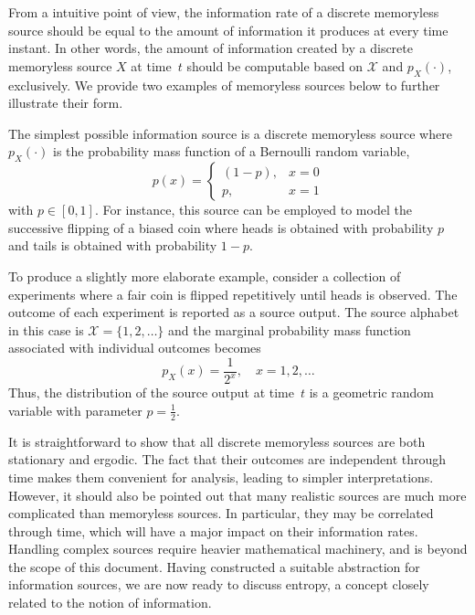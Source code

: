 From a intuitive point of view, the information rate of a discrete memoryless source should be equal to the amount of information it produces at every time instant.
In other words, the amount of information created by a discrete memoryless source $X$ at time~$t$ should be computable based on $\mathcal{X}$ and $p_X(\cdot)$, exclusively.
We provide two examples of memoryless sources below to further illustrate their form.

\begin{example} \label{example:BinarySource}
The simplest possible information source is a discrete memoryless source where $p_X(\cdot)$ is the probability mass function of a Bernoulli random variable,
\begin{equation*}
p(x) = \begin{cases} (1 - p), & x = 0 \\
p, & x = 1 \end{cases}
\end{equation*}
with $p \in [0,1]$.
For instance, this source can be employed to model the successive flipping of a biased coin where heads is obtained with probability $p$ and tails is obtained with probability $1 - p$.
\end{example}

\begin{example}
To produce a slightly more elaborate example, consider a collection of experiments where a fair coin is flipped repetitively until heads is observed.
The outcome of each experiment is reported as a source output.
The source alphabet in this case is $\mathcal{X} = \{1, 2, \ldots \}$ and the marginal probability mass function associated with individual outcomes becomes
\begin{equation*}
p_X (x) = \frac{1}{2^x}, \quad x = 1, 2, \ldots
\end{equation*}
Thus, the distribution of the source output at time~$t$ is a geometric random variable with parameter $p = \frac{1}{2}$.
\end{example}

It is straightforward to show that all discrete memoryless sources are both stationary and ergodic.
The fact that their outcomes are independent through time makes them convenient for analysis, leading to simpler interpretations.
However, it should also be pointed out that many realistic sources are much more complicated than memoryless sources.
In particular, they may be correlated through time, which will have a major impact on their information rates.
Handling complex sources require heavier mathematical machinery, and is beyond the scope of this document.
Having constructed a suitable abstraction for information sources, we are now ready to discuss entropy, a concept closely related to the notion of information.


